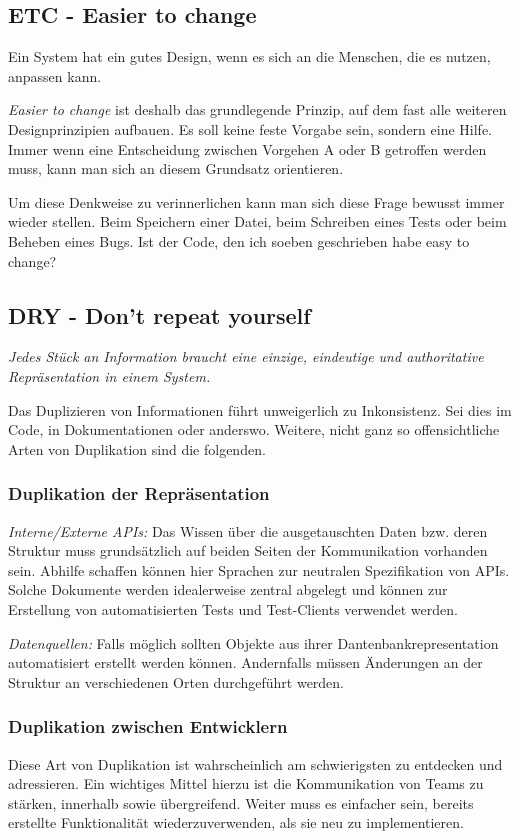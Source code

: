 \documentclass[10pt, oneside]{article}
\begin{document}
\subsection{ETC - Easier to change}
Ein System hat ein gutes Design, wenn es sich an die Menschen, die es nutzen, anpassen kann. 

\emph{Easier to change} ist deshalb das grundlegende Prinzip, auf dem fast alle weiteren Designprinzipien aufbauen. Es soll keine feste Vorgabe sein, sondern eine Hilfe.
Immer wenn eine Entscheidung zwischen Vorgehen A oder B getroffen werden muss, kann man sich an diesem Grundsatz orientieren.

Um diese Denkweise zu verinnerlichen kann man sich diese Frage bewusst immer wieder stellen. Beim Speichern einer Datei, beim Schreiben eines Tests oder beim Beheben eines Bugs. 
Ist der Code, den ich soeben geschrieben habe easy to change?

\subsection{DRY - Don't repeat yourself}
\emph{Jedes Stück an Information braucht eine einzige, eindeutige und authoritative \\
Repräsentation in einem System.}

Das Duplizieren von Informationen führt unweigerlich zu Inkonsistenz. Sei dies im Code, in Dokumentationen oder anderswo. 
Weitere, nicht ganz so offensichtliche Arten von Duplikation sind die folgenden.
\subsubsection*{Duplikation der Repräsentation}
\emph{Interne/Externe APIs:}
Das Wissen über die ausgetauschten Daten bzw. deren Struktur muss grundsätzlich auf beiden Seiten der Kommunikation vorhanden sein. 
Abhilfe schaffen können hier Sprachen zur neutralen Spezifikation von APIs. Solche Dokumente werden idealerweise zentral abgelegt und 
können zur Erstellung von automatisierten Tests und Test-Clients verwendet werden.

\emph{Datenquellen:}
Falls möglich sollten Objekte aus ihrer Dantenbankrepresentation automatisiert erstellt werden können. 
Andernfalls müssen Änderungen an der Struktur an verschiedenen Orten durchgeführt werden.

\subsubsection*{Duplikation zwischen Entwicklern}
Diese Art von Duplikation ist wahrscheinlich am schwierigsten zu entdecken und adressieren. 
Ein wichtiges Mittel hierzu ist die Kommunikation von Teams zu stärken, innerhalb sowie übergreifend.
Weiter muss es einfacher sein, bereits erstellte Funktionalität wiederzuverwenden, als sie neu zu implementieren.
\end{document}
